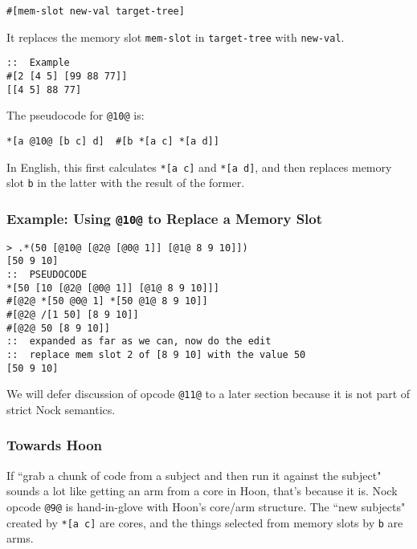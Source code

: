 \documentclass[twoside]{article}
\begin{document}
\begin{lstlisting}[style=listingcode]
#[mem-slot new-val target-tree]
\end{lstlisting}

\noindent
It replaces the memory slot \lstinline[style=inlinecode]{mem-slot} in \lstinline[style=inlinecode]{target-tree} with \lstinline[style=inlinecode]{new-val}.

\begin{lstlisting}[style=listingblock]
::  Example
#[2 [4 5] [99 88 77]]
[[4 5] 88 77]
\end{lstlisting}

\noindent
The pseudocode for \lstinline[style=inlinecode]{@10@} is:

\begin{lstlisting}[style=listingcode]
*[a @10@ [b c] d]  #[b *[a c] *[a d]]
\end{lstlisting}

In English, this first calculates \lstinline[style=inlinecode]{*[a c]} and \lstinline[style=inlinecode]{*[a d]}, and then replaces memory slot \lstinline[style=inlinecode]{b} in the latter with the result of the former.

\subsubsection{Example: Using \lstinline[style=inlinecode]{@10@} to Replace a Memory Slot}

\begin{lstlisting}[style=listingcode]
> .*(50 [@10@ [@2@ [@0@ 1]] [@1@ 8 9 10]])
[50 9 10]
::  PSEUDOCODE
*[50 [10 [@2@ [@0@ 1]] [@1@ 8 9 10]]]
#[@2@ *[50 @0@ 1] *[50 @1@ 8 9 10]]
#[@2@ /[1 50] [8 9 10]]
#[@2@ 50 [8 9 10]]
::  expanded as far as we can, now do the edit
::  replace mem slot 2 of [8 9 10] with the value 50
[50 9 10]
\end{lstlisting}

We will defer discussion of opcode \lstinline[style=inlinecode]{@11@} to a later section because it is not part of strict Nock semantics.

\subsubsection{Towards Hoon}

If ``grab a chunk of code from a subject and then run it against the subject" sounds a lot like getting an arm from a core in Hoon, that's because it is.  Nock opcode \lstinline[style=inlinecode]{@9@} is hand-in-glove with Hoon's core/arm structure.  The ``new subjects" created by \lstinline[style=inlinecode]{*[a c]} are cores, and the things selected from memory slots by \lstinline[style=inlinecode]{b} are arms.
\end{document}

